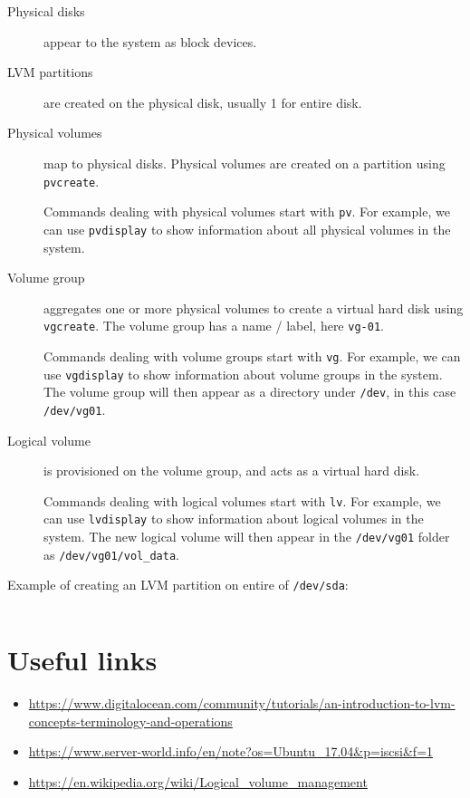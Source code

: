 \begin{description}
\item[Physical disks]
appear to the system as block devices.
\item[LVM partitions]
are created on the physical disk, usually 1 for entire disk. 

\item[Physical volumes]
map to physical disks. Physical volumes are created on a partition using
\texttt{pvcreate}.

Commands dealing with physical volumes start with \texttt{pv}. For
example, we can use \texttt{pvdisplay} to show information about all
physical volumes in the system.

\item[Volume group]
aggregates one or more physical volumes to create a virtual hard disk
using \texttt{vgcreate}. The volume group has a name / label, here
\texttt{vg-01}.

Commands dealing with volume groups start with \texttt{vg}. For example,
we can use \texttt{vgdisplay} to show information about volume groups in
the system. The volume group will then appear as a directory under
\texttt{/dev}, in this case \texttt{/dev/vg01}.

\item[Logical volume]
is provisioned on the volume group, and acts as a virtual hard disk.

Commands dealing with logical volumes start with \texttt{lv}. For
example, we can use \texttt{lvdisplay} to show information about logical
volumes in the system. The new logical volume will then appear in the
\texttt{/dev/vg01} folder as \texttt{/dev/vg01/vol\_data}.
\end{description}


Example of
creating an LVM partition on entire of \texttt{/dev/sda}:

\inputminted{bash}{lvm_commands.sh}

\section{Useful links}\label{useful-links}

\begin{itemize}
\item
  \url{https://www.digitalocean.com/community/tutorials/an-introduction-to-lvm-concepts-terminology-and-operations}
\item
  \url{https://www.server-world.info/en/note?os=Ubuntu_17.04\&p=iscsi\&f=1}
\item
  \url{https://en.wikipedia.org/wiki/Logical_volume_management}
\end{itemize}
